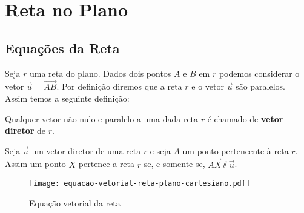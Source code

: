 
\chapter{Reta no Plano} %
\label{cha:reta_no_plano}

\section{Equa\c{c}\~oes da Reta} %
\label{sec:equacoes_da_reta}

Seja $r$ uma reta do plano. Dados dois pontos $A$ e $B$ em $r$ podemos considerar o vetor $\vec{u} = \vec{AB}$. Por defini\c{c}\~ao diremos que a reta $r$ e o vetor $\vec{u}$ s\~ao paralelos. Assim temos a seguinte defini\c{c}\~ao:
\begin{definicao}
  Qualquer vetor n\~ao nulo e paralelo a uma dada reta $r$ \'e chamado de \textbf{vetor diretor} de $r$.
\end{definicao}

Seja $\vec{u}$ um vetor diretor de uma reta $r$ e seja $A$ um ponto pertencente \`a reta $r$. Assim um ponto $X$ pertence a reta $r$ se, e somente se, $\vec{AX}\varparallel\vec{u}$.
\begin{figure}[!h]
  \centering
  \caption{Equa\c{c}\~ao vetorial da reta}
  \texttt{[image: equacao-vetorial-reta-plano-cartesiano.pdf]}


\end{figure}

